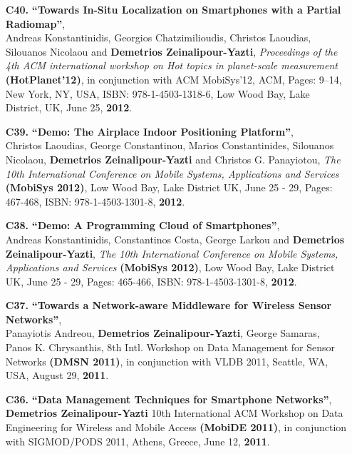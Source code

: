 \documentclass[10pt]{article}
\begin{document}
\begin{enumerate}
\item[{\bf C40.}]
\label{C40}
{\bf ``Towards In-Situ Localization on Smartphones with a Partial Radiomap''}, \\
Andreas Konstantinidis, Georgios Chatzimilioudis, Christos Laoudias, Silouanos Nicolaou and {\bf Demetrios Zeinalipour-Yazti}, 
{\em Proceedings of the 4th ACM international workshop on Hot topics in planet-scale measurement} 
{\bf (HotPlanet'12)}, in conjunction with ACM MobiSys'12, ACM, Pages: 9--14, New York, NY, USA, ISBN: 978-1-4503-1318-6, Low Wood Bay, Lake District, UK, June 25, {\bf 2012}.

\item[{\bf C39.}]
\label{C39}
{\bf ``Demo: The Airplace Indoor Positioning Platform''}, \\
Christos Laoudias, George Constantinou, Marios Constantinides, Silouanos Nicolaou, {\bf Demetrios Zeinalipour-Yazti} and Christos G. Panayiotou,
{\em The 10th International Conference on Mobile Systems, Applications and Services} 
{\bf (MobiSys 2012)}, Low Wood Bay, Lake District UK, June 25 - 29,  Pages: 467-468,
 ISBN: 978-1-4503-1301-8, {\bf 2012}.

\item[{\bf C38.}]
\label{C38}
{\bf ``Demo: A Programming Cloud of Smartphones''}, \\
Andreas Konstantinidis, Constantinos Costa, George Larkou and {\bf Demetrios Zeinalipour-Yazti},
{\em The 10th International Conference on Mobile Systems, Applications and Services} 
{\bf (MobiSys 2012)}, Low Wood Bay, Lake District UK, June 25 - 29, Pages: 465-466,
 ISBN: 978-1-4503-1301-8, {\bf 2012}.
 
\item[{\bf C37.}]
\label{C37}
{\bf ``Towards a Network-aware Middleware for Wireless Sensor Networks''}, \\
Panayiotis Andreou, {\bf Demetrios Zeinalipour-Yazti}, George Samaras, Panos K. Chrysanthis,
8th Intl. Workshop on Data Management for Sensor Networks {\bf (DMSN 2011)}, in conjunction with VLDB 2011,
Seattle, WA, USA, August 29, {\bf 2011}.

\item[{\bf C36.}] 
\label{C36}
{\bf ``Data Management Techniques for Smartphone Networks''}, \\
{\bf Demetrios Zeinalipour-Yazti}
10th International ACM Workshop on Data Engineering for Wireless and Mobile Access {\bf (MobiDE 2011)}, in conjunction with SIGMOD/PODS 2011, Athens, Greece, June 12, {\bf 2011}.


\end{enumerate}
\end{document}
